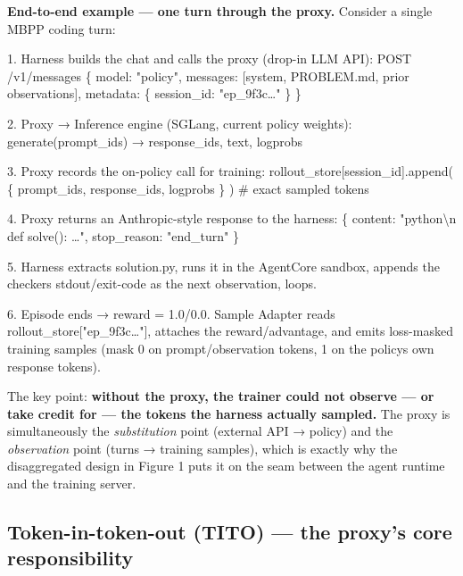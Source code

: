 \documentclass[
  paper=a4,
  ,captions=tableheading
]{scrartcl}
\newenvironment{Shaded}{}{}
\newcommand{\NormalTok}[1]{#1}
\begin{document}
\textbf{End-to-end example --- one turn through the proxy.} Consider a
single MBPP coding turn:

\begin{Shaded}
\begin{Highlighting}[]
\NormalTok{1. Harness builds the chat and calls the proxy (drop{-}in LLM API):}
\NormalTok{     POST /v1/messages   \{ model: "policy",}
\NormalTok{                           messages: [system, PROBLEM.md, prior observations],}
\NormalTok{                           metadata: \{ session\_id: "ep\_9f3c…" \} \}}

\NormalTok{2. Proxy → Inference engine (SGLang, current policy weights):}
\NormalTok{     generate(prompt\_ids) → response\_ids, text, logprobs}

\NormalTok{3. Proxy records the on{-}policy call for training:}
\NormalTok{     rollout\_store[session\_id].append(}
\NormalTok{        \{ prompt\_ids, response\_ids, logprobs \} )   \# exact sampled tokens}

\NormalTok{4. Proxy returns an Anthropic{-}style response to the harness:}
\NormalTok{     \{ content: "\textasciigrave{}\textasciigrave{}\textasciigrave{}python\textbackslash{}n def solve(): …\textasciigrave{}\textasciigrave{}\textasciigrave{}", stop\_reason: "end\_turn" \}}

\NormalTok{5. Harness extracts solution.py, runs it in the AgentCore sandbox,}
\NormalTok{   appends the checker\textquotesingle{}s stdout/exit{-}code as the next observation, loops.}

\NormalTok{6. Episode ends → reward = 1.0/0.0. Sample Adapter reads}
\NormalTok{   rollout\_store["ep\_9f3c…"], attaches the reward/advantage, and emits}
\NormalTok{   loss{-}masked training samples (mask 0 on prompt/observation tokens,}
\NormalTok{   1 on the policy\textquotesingle{}s own response tokens).}
\end{Highlighting}
\end{Shaded}

The key point: \textbf{without the proxy, the trainer could not observe
--- or take credit for --- the tokens the harness actually sampled.} The
proxy is simultaneously the \emph{substitution} point (external API →
policy) and the \emph{observation} point (turns → training samples),
which is exactly why the disaggregated design in Figure 1 puts it on the
seam between the agent runtime and the training server.

\hypertarget{token-in-token-out-tito-the-proxys-core-responsibility}{%
\subsection{Token-in-token-out (TITO) --- the proxy's core
responsibility}\label{token-in-token-out-tito-the-proxys-core-responsibility}}
\end{document}
